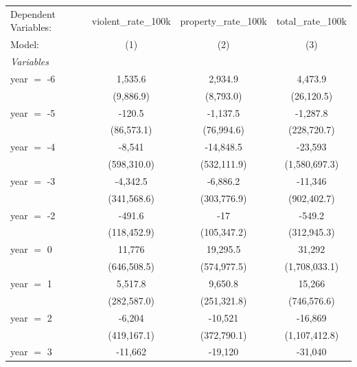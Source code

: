
\begingroup
\centering
\begin{tabular}{lccc}
   \tabularnewline \midrule \midrule
   Dependent Variables: & violent\_rate\_100k   & property\_rate\_100k   & total\_rate\_100k\\    
   Model:               & (1)                   & (2)                    & (3)\\  
   \midrule
   \emph{Variables}\\
   year $=$ -6          & 1,535.6               & 2,934.9                & 4,473.9\\   
                        & (9,886.9)             & (8,793.0)              & (26,120.5)\\   
   year $=$ -5          & -120.5                & -1,137.5               & -1,287.8\\   
                        & (86,573.1)            & (76,994.6)             & (228,720.7)\\   
   year $=$ -4          & -8,541                & -14,848.5              & -23,593\\   
                        & (598,310.0)           & (532,111.9)            & (1,580,697.3)\\   
   year $=$ -3          & -4,342.5              & -6,886.2               & -11,346\\   
                        & (341,568.6)           & (303,776.9)            & (902,402.7)\\   
   year $=$ -2          & -491.6                & -17                    & -549.2\\   
                        & (118,452.9)           & (105,347.2)            & (312,945.3)\\   
   year $=$ 0           & 11,776                & 19,295.5               & 31,292\\   
                        & (646,508.5)           & (574,977.5)            & (1,708,033.1)\\   
   year $=$ 1           & 5,517.8               & 9,650.8                & 15,266\\   
                        & (282,587.0)           & (251,321.8)            & (746,576.6)\\   
   year $=$ 2           & -6,204                & -10,521                & -16,869\\   
                        & (419,167.1)           & (372,790.1)            & (1,107,412.8)\\   
   year $=$ 3           & -11,662               & -19,120                & -31,040\\   

\end{tabular}
